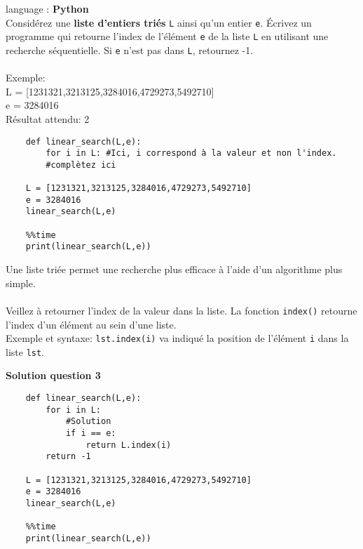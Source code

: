 \begin{Exercice}[5 minutes] language : \textbf{Python}\\

    Considérez une \textbf{liste d’entiers triés} \lstinline{L} ainsi qu’un entier \lstinline{e}. Écrivez un programme qui retourne l'index de l'élément \lstinline{e} de la liste \lstinline{L} en utilisant une recherche séquentielle. Si \lstinline{e} n’est pas dans \lstinline{L}, retournez -1.\\\\
    
    Exemple:\\
    L = [1231321,3213125,3284016,4729273,5492710]\\
    e = 3284016\\
    Résultat attendu: 2\\
  
\begin{verbatim}
    def linear_search(L,e):
        for i in L: #Ici, i correspond à la valeur et non l'index.
        #complètez ici 
        
    L = [1231321,3213125,3284016,4729273,5492710]
    e = 3284016
    linear_search(L,e)
    
    %%time
    print(linear_search(L,e))
\end{verbatim}

    \begin{conseil}
        Une liste triée permet une recherche plus efficace à l'aide d'un algorithme plus simple.\\\\
        Veillez à retourner l'index de la valeur dans la liste. La fonction \lstinline{index()} retourne l'index d'un élément au sein d'une liste.\\Exemple et syntaxe: \lstinline{lst.index(i)} va indiqué la position de l'élément \lstinline{i} dans la liste \lstinline{lst}.
    \end{conseil}

    \textbf{Solution question 3}

    \begin{verbatim}
    def linear_search(L,e):
        for i in L:
            #Solution
            if i == e:
                return L.index(i)
        return -1
        
    L = [1231321,3213125,3284016,4729273,5492710]
    e = 3284016
    linear_search(L,e)
    
    %%time
    print(linear_search(L,e))
    \end{verbatim}
\end{Exercice}

